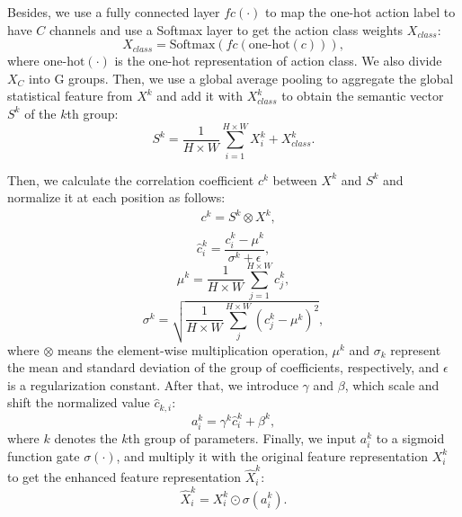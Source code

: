 \documentclass[journal,twoside]{IEEEtran}
\begin{document}
Besides, we use a fully connected layer $fc(\cdot)$ to map the one-hot action label to have $C$ channels and use a Softmax layer to get the action class weights $X_{class}$:
\begin{equation}
    X_{class}=\text{Softmax}(fc(\text{one-hot}(c))), \label{eq:no7}
\end{equation}
where $\text{one-hot}(\cdot)$ is the one-hot representation of action class. We also divide $X_{C}$ into G groups.
Then, we use a global average pooling to aggregate the global statistical feature from $X^{k}$ and add it with $X_{class}^{k}$ to obtain the semantic vector $S^{k}$ of the $k$th group:
\begin{equation}
    S^{k}=\frac{1}{H \times W}\sum_{i=1}^{H \times W} X_{i}^k+X_{class}^k. \label{eq:no8}
\end{equation}

Then, we calculate the correlation coefficient $c^k$ between $X^k$ and $S^k$ and normalize it at each position as follows:
\begin{equation}
\begin{split}
    & c^k=S^k \otimes X^k, \\
\end{split}
\end{equation}
\begin{equation}
   \hat{c}_{i}^k=\frac{c_{i}^k-\mu^{k}}{\sigma^{k}+\epsilon}, \label{eq:no10}
\end{equation}
\begin{equation}
   \mu^{k}=\frac{1}{H \times W}\sum_{j=1}^{H \times W} c_{j}^k,  \label{eq:no11}
\end{equation}
\begin{equation}
   \sigma^{k} = \sqrt{\frac{1}{H \times W}\sum_{j}^{H \times W} (c_{j}^k-\mu^{k})^2}, \label{eq:no12}
\end{equation}
where $\otimes$ means the element-wise multiplication operation, $\mu^{k}$ and $\sigma_{k}$ represent the mean and standard deviation of the group of coefficients, respectively, and $\epsilon$ is a regularization constant. After that, we introduce $\gamma$ and $\beta$, which scale and shift the normalized value $\hat{c}_{k, i}$:
\begin{equation}
   a_{i}^k=\gamma^{k}\hat{c}_{i}^k+\beta^{k}, \label{eq:no13}
\end{equation}
where $k$ denotes the $k$th group of parameters. Finally, we input $a_{i}^k$ to a sigmoid function gate $\sigma(\cdot)$, and multiply it with the original feature representation $X_{i}^k$ to get the enhanced feature representation $\hat{X}_{i}^k$:
\begin{equation}
    \hat{X}_{i}^k=X_{i}^k\odot \sigma(a_{i}^k).  \label{eq:no14}
\end{equation}
\end{document}
